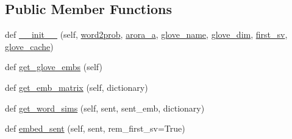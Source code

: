\subsection*{Public Member Functions}
\begin{DoxyCompactItemize}
\item 
def \hyperlink{classcontrollable__seq2seq_1_1arora_1_1SentenceEmbedder_adc37598b87a8271ee9c28f4f29d2111e}{\+\_\+\+\_\+init\+\_\+\+\_\+} (self, \hyperlink{classcontrollable__seq2seq_1_1arora_1_1SentenceEmbedder_a3a0e8a0333cc523bc57aa8f2f6187a5c}{word2prob}, \hyperlink{classcontrollable__seq2seq_1_1arora_1_1SentenceEmbedder_a14187c96a59bc562fa4749498608eed1}{arora\+\_\+a}, \hyperlink{classcontrollable__seq2seq_1_1arora_1_1SentenceEmbedder_a2053bb8bcd6b2ebb12fa164232ba2402}{glove\+\_\+name}, \hyperlink{classcontrollable__seq2seq_1_1arora_1_1SentenceEmbedder_a5c9e975f252f1bd70fd77944e4ffbbe0}{glove\+\_\+dim}, \hyperlink{classcontrollable__seq2seq_1_1arora_1_1SentenceEmbedder_ab1517d287364c3ecc36ae4b55e272b06}{first\+\_\+sv}, \hyperlink{classcontrollable__seq2seq_1_1arora_1_1SentenceEmbedder_a7cd48cd4b59e86541c4fa7fdfd4673e4}{glove\+\_\+cache})
\item 
def \hyperlink{classcontrollable__seq2seq_1_1arora_1_1SentenceEmbedder_aa53ecb589f5fe43fe92d326511491e98}{get\+\_\+glove\+\_\+embs} (self)
\item 
def \hyperlink{classcontrollable__seq2seq_1_1arora_1_1SentenceEmbedder_a3fd8ad770106ea5a883df90ed4bda370}{get\+\_\+emb\+\_\+matrix} (self, dictionary)
\item 
def \hyperlink{classcontrollable__seq2seq_1_1arora_1_1SentenceEmbedder_ab01f3112c0765e2c7f9da902386ac865}{get\+\_\+word\+\_\+sims} (self, sent, sent\+\_\+emb, dictionary)
\item 
def \hyperlink{classcontrollable__seq2seq_1_1arora_1_1SentenceEmbedder_a1a24583e505d601696f51d5e5a0a3182}{embed\+\_\+sent} (self, sent, rem\+\_\+first\+\_\+sv=True)
\end{DoxyCompactItemize}
